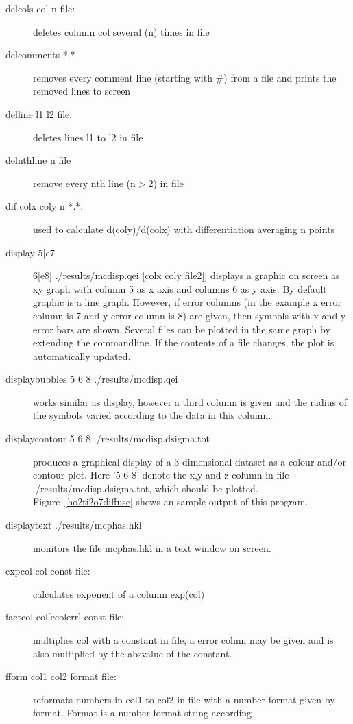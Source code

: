 \begin{description}
\item [\prg delcols col n file:] deletes column col several (n) times in file
\item [\prg delcomments *.*] removes every comment line (starting with \#) from a file and %
prints the removed lines to screen
\item [\prg delline l1 l2 file:] deletes lines l1 to l2  in file
\item [\prg delnthline n file]  remove every nth line (n$>$2) in file
\item [\prg dif colx coly n *.*:] used to calculate d(coly)/d(colx) with %
differentiation averaging n points
\item [\prg display 5[e7] 6[e8]  ./results/mcdisp.qei {[colx coly file2]}] displays a graphic on screen as xy %
graph
with column 5 as x axis and columns 6 as y axis. By default graphic is a line graph.
However, if error columns (in the example x error column is 7 and y error column is 8)
are given, then symbols with x and y error bars are shown. Several files
can be plotted in the same graph by extending the commandline. If the contents of a file
changes, the plot is automatically updated.
\item [\prg displaybubbles  5 6 8 ./results/mcdisp.qei] works similar as %
display, however
a third column is given and the radius of the symbols varied according to the data in 
this column.
\item [\prg displaycontour 5 6 8 ./results/mcdisp.dsigma.tot] produces a %
graphical
display of a 3 dimensional dataset as a colour and/or contour plot. Here '5 6 8' 
denote the x,y and z column in file {\prg ./results/mcdisp.dsigma.tot}, which should
be plotted. Figure~\ref{ho2ti2o7diffuse} shows an sample output of this program.
\item [\prg displaytext ./results/mcphas.hkl] monitors the file mcphas.hkl in %
a text window
on screen.
\item [\prg expcol col const file:] calculates exponent of a column exp(col) 
\item [\prg factcol col{[ecolerr]} const file:] multiplies col with a constant in file,
a error colmn may be given and is also multiplied by the absvalue of the constant.
\item [\prg fform col1 col2 format file:] reformats numbers in col1 to col2 in file %
with
             a number format given by format. Format is a number format string according

\end{description}
